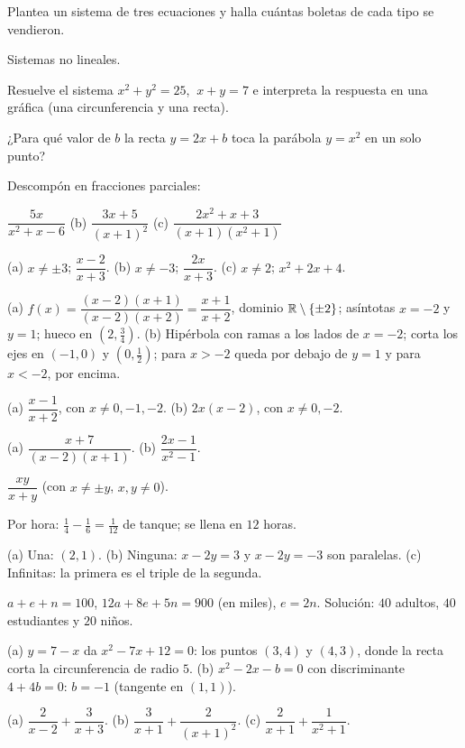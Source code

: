 \documentclass[11pt,a4paper]{article}
\begin{document}
\begin{ejercicios}
  Plantea un sistema de tres ecuaciones y halla cuántas boletas de cada tipo se vendieron.
\item Sistemas no lineales.
  \begin{ejercicios}
  \item Resuelve el sistema $x^2+y^2=25$, $\ x+y=7$ e interpreta la respuesta en una gráfica (una circunferencia y una recta).
  \item ¿Para qué valor de $b$ la recta $y=2x+b$ toca la parábola $y=x^2$ en un solo punto?
  \end{ejercicios}
\item Descompón en fracciones parciales:
  \begin{ejercicios}
  \item $\dfrac{5x}{x^2+x-6}$ \qquad (b) $\dfrac{3x+5}{(x+1)^2}$ \qquad (c) $\dfrac{2x^2+x+3}{(x+1)\left(x^2+1\right)}$
  \end{ejercicios}
\end{ejercicios}

\clearpage
\respuestas
\begin{respuestascortas}
\begin{soluciones}
\item (a) $x\neq\pm3$; $\dfrac{x-2}{x+3}$. (b) $x\neq-3$; $\dfrac{2x}{x+3}$. (c) $x\neq2$; $x^2+2x+4$.
\item (a) $f(x)=\dfrac{(x-2)(x+1)}{(x-2)(x+2)}=\dfrac{x+1}{x+2}$, dominio $\mathbb{R}\setminus\{\pm2\}$; asíntotas $x=-2$ y
  $y=1$; hueco en $\left(2,\tfrac34\right)$. (b) Hipérbola con ramas a los lados de $x=-2$; corta los ejes en
  $(-1,0)$ y $\left(0,\tfrac12\right)$; para $x>-2$ queda por debajo de $y=1$ y para $x<-2$, por encima.
\item (a) $\dfrac{x-1}{x+2}$, con $x\neq0,-1,-2$. (b) $2x(x-2)$, con $x\neq0,-2$.
\item (a) $\dfrac{x+7}{(x-2)(x+1)}$. (b) $\dfrac{2x-1}{x^2-1}$.
\item $\dfrac{xy}{x+y}$ (con $x\neq\pm y$, $x,y\neq0$).
\item Por hora: $\frac14-\frac16=\frac1{12}$ de tanque; se llena en $12$ horas.
\item (a) Una: $(2,1)$. (b) Ninguna: $x-2y=3$ y $x-2y=-3$ son paralelas. (c) Infinitas: la primera es el triple de la segunda.
\item $a+e+n=100$, $12a+8e+5n=900$ (en miles), $e=2n$. Solución: $40$ adultos, $40$ estudiantes y $20$ niños.
\item (a) $y=7-x$ da $x^2-7x+12=0$: los puntos $(3,4)$ y $(4,3)$, donde la recta corta la circunferencia de radio $5$.
  (b) $x^2-2x-b=0$ con discriminante $4+4b=0$: $b=-1$ (tangente en $(1,1)$).
\item (a) $\dfrac{2}{x-2}+\dfrac{3}{x+3}$. (b) $\dfrac{3}{x+1}+\dfrac{2}{(x+1)^2}$. (c) $\dfrac{2}{x+1}+\dfrac{1}{x^2+1}$.
\end{soluciones}
\end{respuestascortas}
\end{document}
